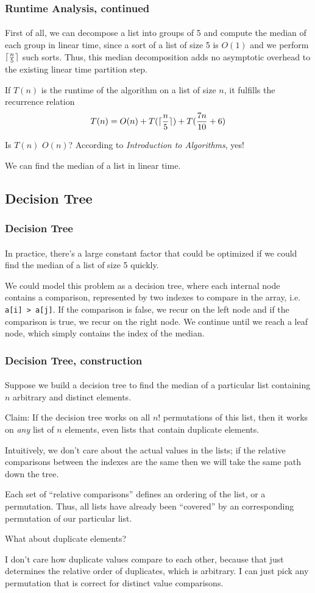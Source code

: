 \documentclass{beamer}                             %
\DeclarePairedDelimiter\ceil{\lceil}{\rceil}
\begin{document}
\begin{frame}
\frametitle{Runtime Analysis, continued}
\framesubtitle{}
First of all, we can decompose a list into groups of 5 and compute the
median of each group in linear time, since a sort of a list of size 5 is
\( O(1) \) and we perform \( \ceil{\frac{n}{5}} \) such sorts.
Thus, this median decomposition adds no asymptotic overhead
to the existing linear time partition step. \pause

If \( T(n) \) is the runtime of the algorithm on a list of size \( n \),
it fulfills the recurrence relation
\[ T(n) = O(n) + T(\ceil{\frac{n}{5}}) + T(\frac{7n}{10} + 6) \] \pause

Is \( T(n) \) \( O(n) \)? According to \textit{Introduction to Algorithms}, yes!

We can find the median of a list in linear time.
\end{frame}

\subsection{Decision Tree}

\begin{frame}
\frametitle{Decision Tree}
\framesubtitle{}
In practice, there's a large constant factor that could be optimized if we
could find the median of a list of size 5 quickly. \pause

We could model this problem as a \alert{decision tree}, where each internal node
contains a comparison, represented by two indexes to compare in the array,
i.e. \texttt{a[i] > a[j]}.
If the comparison is false, we recur on the left node
and if the comparison is true, we recur on the right node.
We continue until we reach a leaf node,
which simply contains the index of the median.
\end{frame}

\begin{frame}
\frametitle{Decision Tree, construction}
\framesubtitle{}
Suppose we build a decision tree to find the median of a particular list
containing \( n \) arbitrary and distinct elements. \pause

Claim: If the decision tree works on all \( n! \) permutations of this list,
then it works on \textit{any} list of \( n \) elements, even lists that contain
duplicate elements. \pause

Intuitively, we don't care about the actual values in the lists;
if the relative comparisons between the indexes are the same then we will
take the same path down the tree. \pause

Each set of \enquote{relative comparisons} defines an ordering of the list,
or a permutation. Thus, all lists have already been \enquote{covered}
by an corresponding permutation of our particular list. \pause

What about duplicate elements? \pause

I don't care how duplicate values compare to each other, because that just
determines the relative order of duplicates, which is arbitrary.
I can just pick any permutation that is correct for distinct value comparisons.
\end{frame}
\end{document}

